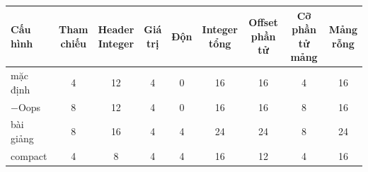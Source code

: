 \begin{tabular}{lcccccccc}
\toprule
Cấu hình & \makecell{Tham \\ chiếu} & \makecell{Header \\ Integer} & \makecell{Giá \\ trị} & Độn & \makecell{Integer \\ tổng} & \makecell{Offset \\ phần tử} & \makecell{Cỡ phần \\ tử mảng} & \makecell{Mảng \\ rỗng} \\
\midrule
mặc định & 4 & 12 & 4 & 0 & 16 & 16 & 4 & 16 \\
$-$Oops & 8 & 12 & 4 & 0 & 16 & 16 & 8 & 16 \\
bài giảng & 8 & 16 & 4 & 4 & 24 & 24 & 8 & 24 \\
compact & 4 & 8 & 4 & 4 & 16 & 12 & 4 & 16 \\
\bottomrule
\end{tabular}
